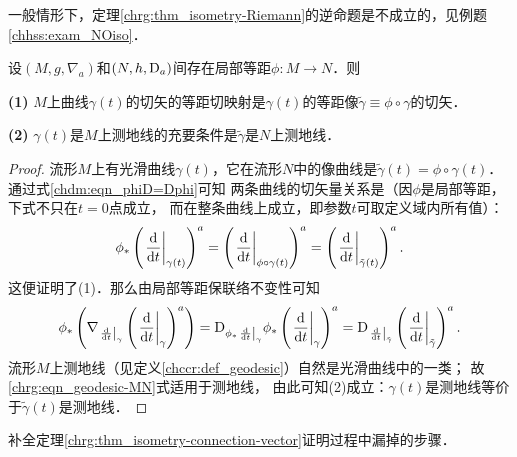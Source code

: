 一般情形下，定理\ref{chrg:thm_isometry-Riemann}的逆命题是不成立的，见例题\ref{chhss:exam_NOiso}．

\begin{theorem}\label{chrg:thm_geodesic-MN}
    设$(M,g,\nabla_a)$和$(N,h,{\rm D}_a)$间存在局部等距$\phi:M\to N$．则

    {\bfseries (1)} $M$上曲线$\gamma(t)$的切矢的等距切映射是$\gamma(t)$的等距像$\tilde{\gamma}\equiv\phi\circ \gamma$的切矢．

    {\bfseries (2)} $\gamma(t)$是$M$上测地线的充要条件是$\tilde{\gamma}$是$N$上测地线．
\end{theorem}
\begin{proof}
    流形$M$上有光滑曲线$\gamma(t)$，它在流形$N$中的像曲线是$\tilde{\gamma}(t)=\phi\circ\gamma(t)$．
    通过式\eqref{chdm:eqn_phiD=Dphi}可知
    两条曲线的切矢量关系是（因$\phi$是局部等距，下式不只在$t=0$点成立，
    而在整条曲线上成立，即参数$t$可取定义域内所有值）：
    \begin{equation}\label{chrg:eqn_dgM-gdN}
        \phi_{*}\left(\left.\frac{{\rm d}  }{{\rm d} t}\right|_{\gamma(t)}\right)^a
        = \left(\left.\frac{{\rm d}  }{{\rm d} t}\right|_{\phi\circ\gamma(t)}\right)^a
        = \left(\left.\frac{{\rm d}  }{{\rm d} t}\right|_{\tilde{\gamma}(t)}\right)^a.
    \end{equation}
    这便证明了(1)．那么由局部等距保联络不变性可知
    \begin{equation}\label{chrg:eqn_geodesic-MN}
       \phi_{*}\left( \nabla_{\left.\frac{{\rm d}  }{{\rm d} t}\right|_{\gamma}}
         \left(\left.\frac{{\rm d}  }{{\rm d} t}\right|_{\gamma}\right)^a \right)
       ={\rm D}_{\phi_{*}\left.\frac{{\rm d}  }{{\rm d} t}\right|_{\gamma}}
         \phi_{*}\left(\left.\frac{{\rm d}  }{{\rm d} t}\right|_{\gamma}\right)^a
       ={\rm D}_{\left.\frac{{\rm d}  }{{\rm d} t}\right|_{\tilde{\gamma}}}
       \left(\left.\frac{{\rm d}  }{{\rm d} t}\right|_{\tilde{\gamma}}\right)^a .
    \end{equation} %
    流形$M$上测地线（见定义\ref{chccr:def_geodesic}）自然是光滑曲线中的一类；
    故\eqref{chrg:eqn_geodesic-MN}式适用于测地线，
    由此可知(2)成立：$\gamma(t)$是测地线等价于$\tilde{\gamma}(t)$是测地线．
\end{proof}


\begin{exercise}
	补全定理\ref{chrg:thm_isometry-connection-vector}证明过程中漏掉的步骤．
\end{exercise}

